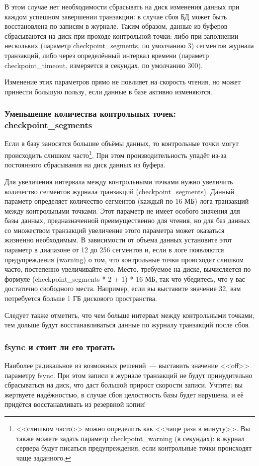 В этом случае нет необходимости сбрасывать на диск изменения данных при каждом успешном завершении транзакции:
в случае сбоя БД может быть восстановлена по записям в журнале. Таким образом, данные из буферов сбрасываются на диск
при проходе контрольной точки: либо при заполнении нескольких (параметр checkpoint\_segments, по умолчанию 3) сегментов
журнала транзакций, либо через определённый интервал времени (параметр checkpoint\_timeout, измеряется в секундах, по умолчанию 300).

Изменение этих параметров прямо не повлияет на скорость чтения, но может принести большую пользу, если данные в базе активно изменяются.

\subsubsection{Уменьшение количества контрольных точек: checkpoint\_segments}
Если в базу заносятся большие объёмы данных, то контрольные точки могут происходить слишком часто\footnote{<<слишком часто>>
можно определить как <<чаще раза в минуту>>. Вы также можете задать параметр checkpoint\_warning (в секундах):
в журнал сервера будут писаться предупреждения, если контрольные точки происходят чаще заданного.}.
При этом производительность упадёт из-за постоянного сбрасывания на диск данных из буфера.

Для увеличения интервала между контрольными точками нужно увеличить количество сегментов журнала транзакций (checkpoint\_segments).
Данный параметр определяет количество сегментов (каждый по 16 МБ) лога транзакций между контрольными точками.
Этот параметр не имеет особого значения для базы данных, предназначенной преимущественно для чтения, но для баз данных со
множеством транзакций увеличение этого параметра может оказаться жизненно необходимым. В зависимости от объема данных
установите этот параметр в диапазоне от 12 до 256 сегментов и, если в логе появляются предупреждения (warning) о том, что
контрольные точки происходят слишком часто, постепенно увеличивайте его. Место, требуемое на диске, вычисляется по формуле
(checkpoint\_segments * 2 + 1) * 16 МБ, так что убедитесь, что у вас достаточно свободного места. Например, если вы выставите
значение 32, вам потребуется больше 1 ГБ дискового пространства.

Следует также отметить, что чем больше интервал между контрольными точками, тем дольше будут восстанавливаться данные по
журналу транзакций после сбоя.

\subsubsection{fsync и стоит ли его трогать}
Наиболее радикальное из возможных решений~--- выставить значение <<off>> параметру fsync. При этом записи в журнале транзакций не
будут принудительно сбрасываться на диск, что даст большой прирост скорости записи. Учтите: вы жертвуете надёжностью, в случае
сбоя целостность базы будет нарушена, и её придётся восстанавливать из резервной копии!

